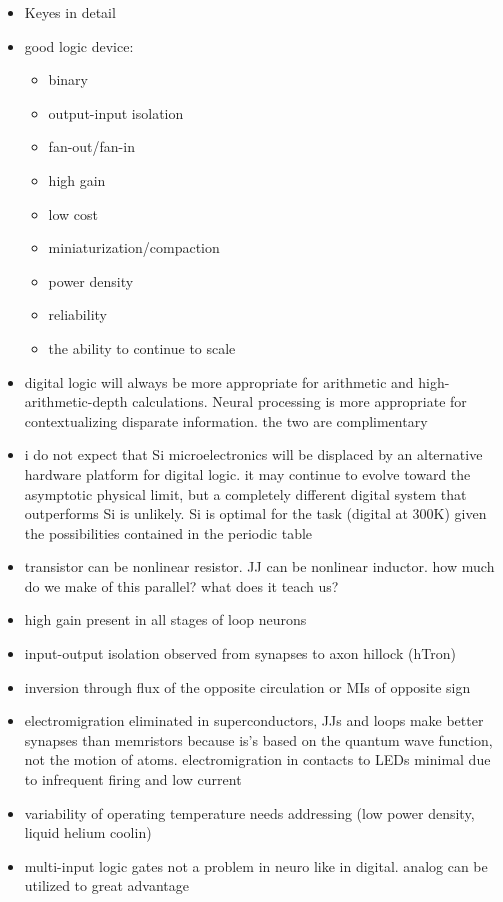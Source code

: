 \begin{itemize}
\item Keyes in detail
\item good logic device:
\begin{itemize}
\item binary
\item output-input isolation
\item fan-out/fan-in
\item high gain
\item low cost
\item miniaturization/compaction
\item power density
\item reliability
\item the ability to continue to scale
\end{itemize}
\item digital logic will always be more appropriate for arithmetic and high-arithmetic-depth calculations. Neural processing is more appropriate for contextualizing disparate information. the two are complimentary
\item i do not expect that Si microelectronics will be displaced by an alternative hardware platform for digital logic. it may continue to evolve toward the asymptotic physical limit, but a completely different digital system that outperforms Si is unlikely. Si is optimal for the task (digital at 300K) given the possibilities contained in the periodic table
\item transistor can be nonlinear resistor. JJ can be nonlinear inductor. how much do we make of this parallel? what does it teach us?
\item high gain present in all stages of loop neurons
\item input-output isolation observed from synapses to axon hillock (hTron)
\item inversion through flux of the opposite circulation or MIs of opposite sign
\item electromigration eliminated in superconductors, JJs and loops make better synapses than memristors because is's based on the quantum wave function, not the motion of atoms. electromigration in contacts to LEDs minimal due to infrequent firing and low current
\item variability of operating temperature needs addressing (low power density, liquid helium coolin)
\item multi-input logic gates not a problem in neuro like in digital. analog can be utilized to great advantage

\end{itemize}
